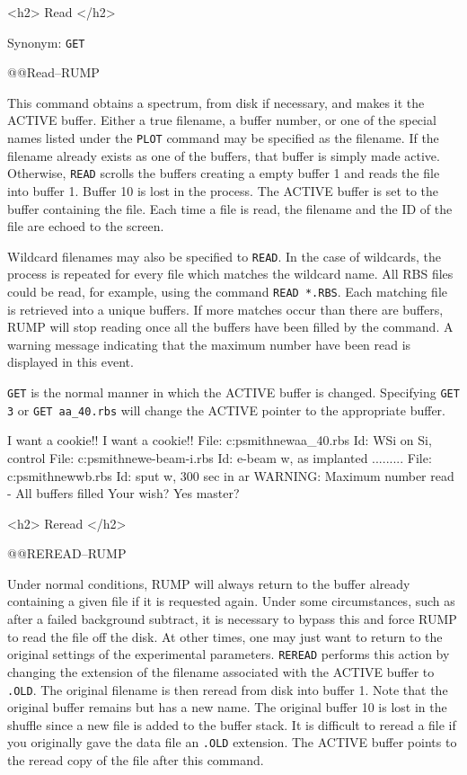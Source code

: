 {<h2> Read </h2>


Synonym:  {\tt GET}

@@{Read--RUMP}

This command obtains a spectrum, from disk if necessary, and makes it the
ACTIVE buffer.  Either a true filename, a buffer number, or one of the special
names listed under the {\tt PLOT} command may be specified as the filename. 
If the filename already exists as one of the buffers, that buffer is simply
made active.  Otherwise, {\tt READ} scrolls the buffers creating a empty
buffer 1 and reads the file into buffer 1.  Buffer 10 is lost in the process.
The ACTIVE buffer is set to the buffer containing the file.  Each time a file
is read, the filename and the ID of the file are echoed to the screen.

Wildcard filenames may also be specified to {\tt READ}.  In the case of
wildcards, the process is repeated for every file which matches the wildcard
name.  All RBS files could be read, for example, using the command {\tt READ
*.RBS}.  Each matching file is retrieved into a unique buffers.  If more
matches occur than there are buffers, RUMP will stop reading once all the
buffers have been filled by the command.  A warning message indicating that 
the maximum number have been read is displayed in this event.

{\tt GET} is the normal manner in which the ACTIVE buffer is changed. 
Specifying {\tt GET 3} or {\tt GET aa\_40.rbs} will change the ACTIVE pointer
to the appropriate buffer.

\medskip\beginscreen
I want a cookie!! 
I want a cookie!! 
File: c:{\bs}psmith{\bs}new{\bs}aa\_40.rbs
Id:   WSi on Si, control
File: c:{\bs}psmith{\bs}new{\bs}e-beam-i.rbs
Id:   e-beam w, as implanted
   .........
File: c:{\bs}psmith{\bs}new{\bs}wb.rbs
Id:   sput w, 300 sec in ar
WARNING: Maximum number read - All buffers filled
Your wish? 
Yes master?
\endscreen


<h2> Reread </h2>


@@{REREAD--RUMP}

Under normal conditions, RUMP will always return to the buffer already
containing a given file if it is requested again.  Under some circumstances,
such as after a failed background subtract, it is necessary to bypass this and
force RUMP to read the file off the disk.  At other times, one may just want
to return to the original settings of the experimental parameters. 
{\tt REREAD} performs this action by changing the extension of the filename
associated with the ACTIVE buffer to {\tt .OLD}.  The original filename is
then reread from disk into buffer 1.  Note that the original buffer remains
but has a new name.  The original buffer 10 is lost in the shuffle since a new
file is added to the buffer stack.  It is difficult to reread a file if you
originally gave the data file an {\tt .OLD} extension.  The ACTIVE buffer
points to the reread copy of the file after this command.

}
